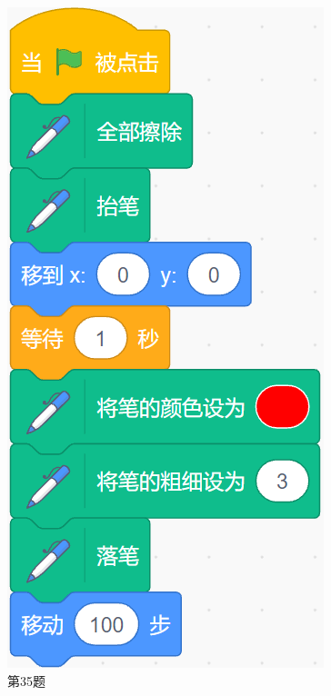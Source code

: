 \documentclass[10pt, a4paper]{article}
\begin{document}
\begin{enumerate}
\begin{figure}[htbp]
\begin{minipage}[t]{.12\textwidth}
                \includegraphics[width=\textwidth]{35.png}
                \caption*{第35题}
            \end{minipage}
        \end{figure}
        

\end{enumerate}
\end{document}
